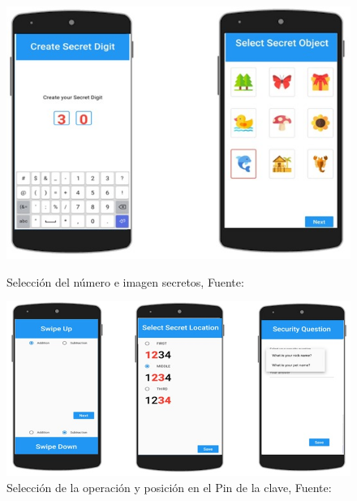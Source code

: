 \begin{anexos}
 \begin{figure}[H]
	\centering
	\begin{minipage}[b]{0.4\linewidth}  %
		\centering
		\includegraphics[width=\linewidth]{grapin-secret.jpg}
		\caption{Selección del número e imagen secretos, Fuente: \cite{kausar2022gra} }
	\end{minipage}%
	\hfill
	\begin{minipage}[b]{0.5\linewidth} %
		\centering
		\includegraphics[width=\linewidth]{grapin-position.jpg}
		\caption{Selección de la operación y posición en el Pin de la clave, Fuente: \cite{kausar2022gra}  }          
	\end{minipage}
	\begin{minipage}[b]{0.4\linewidth} %
		\centering

\end{minipage}
\end{figure}
\end{anexos}
